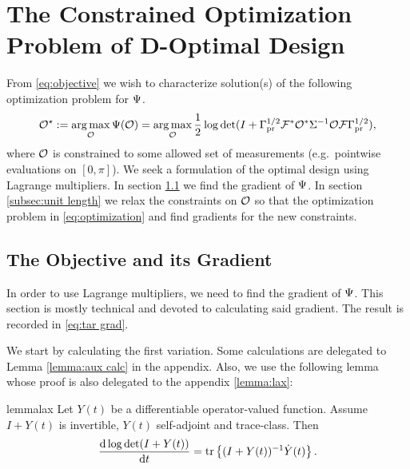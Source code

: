 \documentclass{amsart}
\numberwithin{equation}{section}
\begin{document}
\section{The Constrained Optimization Problem of D-Optimal Design}\label{section:D and grad}
From \eqref{eq:objective} we wish to characterize solution(s) of the
following optimization problem for $\Psi$. %
\begin{align}\label{eq:optimization}
  \mathcal{O}^{\star} := \operatorname*{arg\,max}_{\mathcal{O}} \Psi( \mathcal{O} ) 
  = \operatorname*{arg\,max}_{\mathcal{O}} \frac12 \log \det 
  (I + \Gamma_{\textup{pr}}^{1/2} \mathcal{F}^*\mathcal{O}^* \Sigma^{-1} \mathcal{O} \mathcal{F} \Gamma_{\textup{pr}}^{1/2}),
\end{align}
where $\mathcal{O}$ is constrained to some allowed set of measurements
(e.g.\ pointwise evaluations on $[0,\pi]$).
We seek a formulation of the optimal design using Lagrange
multipliers. In section \ref{section:objective} we find the gradient
of $\Psi$. In section \ref{subsec:unit length} we relax the
constraints on $\mathcal{O}$ so that the optimization problem in
\eqref{eq:optimization}  and find
gradients for the new constraints.

\subsection{The Objective and its Gradient}\label{section:objective}
In order to use Lagrange multipliers, we need to find the gradient of
$\Psi$. This section is mostly technical and devoted to calculating
said gradient. The result is recorded in \eqref{eq:tar grad}.

We start by calculating the first variation. Some calculations are
delegated to Lemma \ref{lemma:aux calc} in the appendix. Also, we use
the following lemma whose proof is also delegated to the appendix
\ref{lemma:lax}:
\begin{restatable*}{lemma}{lax}\label{lemma:lax}
  Let $Y(t)$ be a differentiable operator-valued function. Assume 
  $I+Y(t)$ is invertible, $Y(t)$ self-adjoint and trace-class. Then
  \begin{equation*}
    \frac{\text{\textup{d}} \log \det (I+Y(t))}{\text{\textup{d}} t} = \textup{tr}\left \{(I+Y(t))^{-1} \dot{Y}(t) \right \}.
  \end{equation*}
\end{restatable*}
\end{document}
